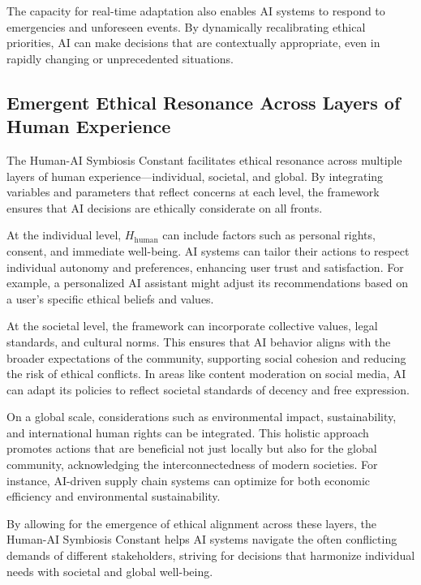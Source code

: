 \documentclass[12pt]{article}
\begin{document}
The capacity for real-time adaptation also enables AI systems to respond to emergencies and unforeseen events. By dynamically recalibrating ethical priorities, AI can make decisions that are contextually appropriate, even in rapidly changing or unprecedented situations.


\subsection{Emergent Ethical Resonance Across Layers of Human Experience}

The Human-AI Symbiosis Constant facilitates ethical resonance across multiple layers of human experience—individual, societal, and global. By integrating variables and parameters that reflect concerns at each level, the framework ensures that AI decisions are ethically considerate on all fronts.

At the individual level, $H_{\text{human}}$ can include factors such as personal rights, consent, and immediate well-being. AI systems can tailor their actions to respect individual autonomy and preferences, enhancing user trust and satisfaction. For example, a personalized AI assistant might adjust its recommendations based on a user's specific ethical beliefs and values.

At the societal level, the framework can incorporate collective values, legal standards, and cultural norms. This ensures that AI behavior aligns with the broader expectations of the community, supporting social cohesion and reducing the risk of ethical conflicts. In areas like content moderation on social media, AI can adapt its policies to reflect societal standards of decency and free expression.

On a global scale, considerations such as environmental impact, sustainability, and international human rights can be integrated. This holistic approach promotes actions that are beneficial not just locally but also for the global community, acknowledging the interconnectedness of modern societies. For instance, AI-driven supply chain systems can optimize for both economic efficiency and environmental sustainability.

By allowing for the emergence of ethical alignment across these layers, the Human-AI Symbiosis Constant helps AI systems navigate the often conflicting demands of different stakeholders, striving for decisions that harmonize individual needs with societal and global well-being.
\end{document}
